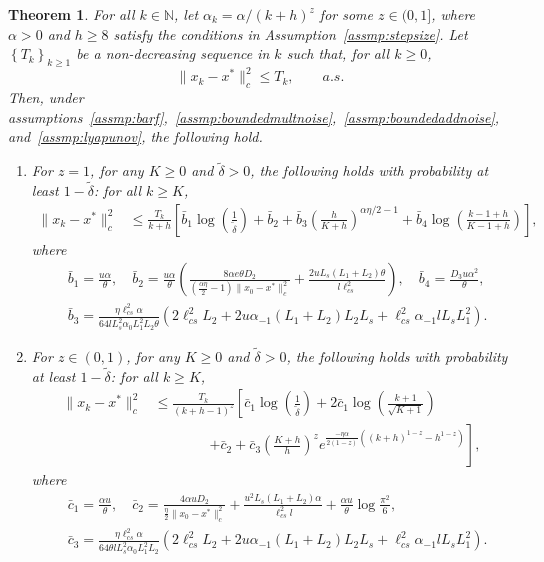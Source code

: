 \documentclass{article}
\newcommand{\lrset}[1]{\left\{ #1 \right\}}
\newcommand{\lrp}[1]{\left( #1 \right)}
\newcommand{\N}{\mathbb{N}}
\newcommand{\lcs}{\ell_{cs}}
\newtheorem{theorem}{Theorem}[section]
\begin{document}
\begin{theorem}\label{th:onestepbootstrap}
    For all $k\in\N$, let $\alpha_k = \alpha/(k+h)^z$ for some $z\in(0,1]$, where $\alpha > 0$ and $h \ge 8$ satisfy the conditions in Assumption~\ref{assmp:stepsize}. Let $\lrset{T_k}_{k\ge 1}$ be a non-decreasing sequence in $k$ such that, for all $k\geq 0$,
    \[ \|x_k - x^*\|^2_c \leq T_k, \qquad a.s. \]
    Then, under assumptions~\ref{assmp:barf},~\ref{assmp:boundedmultnoise},~\ref{assmp:boundedaddnoise}, and~\ref{assmp:lyapunov}, the following hold.
    \begin{enumerate}
    \item \label{part1} For $z=1$, for any $K\ge 0$ and $\tilde{\delta} > 0$, the following holds with probability at least $1- \tilde{\delta}$: for all $k\ge K$, 
\begin{align*}
    \|x_k - x^*\|^2_c & \le \frac{T_k}{k+h} \left[ \bar{b}_1\log\left(\frac{1}{\tilde{\delta}}\right) + \bar{b}_2 + \bar{b}_3\lrp{\frac{h}{K+h}}^{\alpha \eta/2 - 1}    + \bar{b}_4  \log\left(\frac{k-1+h}{K-1+h}\right)  \right], 
\end{align*}
where
\begin{align*}
    &\bar{b}_1 = \frac{u\alpha}{\theta}, \quad \bar{b}_2 = \frac{u\alpha}{\theta}\lrp{ \frac{8\alpha e \theta D_2}{(\frac{\alpha\eta}{2} - 1)\|x_0 - x^*\|^2_c} + \frac{ 2u L_s (L_1 + L_2) \theta }{ l\lcs^2}},\quad \bar{b}_4 = \frac{D_3 u\alpha^2}{\theta},\\
    & \bar{b}_3 = \frac{\eta\lcs^2 \alpha}{64 l L^2_s \alpha_0 L^2_1 L_2 \theta }\lrp{2\lcs^2 L_2 +  2 u \alpha_{-1} (L_1 + L_2)  L_2 L_s + \lcs^2 \alpha_{-1} l L_s L^2_1 }.
\end{align*}
\item \label{partz} For $z\in(0,1)$, for any  $K\ge 0$ and $\tilde{\delta} > 0$, the following holds with probability at least $1 - \tilde{\delta}$: for all $k \ge K$, 
\begin{align*}
    \|x_k - x^*\|^2_c &\le  \frac{T_k}{(k+h-1)^z} \left[ \bar{c}_1\log\lrp{\frac{1}{\tilde{\delta}}} + 2\bar{c}_1\log\lrp{\frac{k+1}{\sqrt{K+1}}} \right. \\
    &\qquad \qquad \left. + \bar{c}_2 + \bar{c}_3 \lrp{\frac{K+h}{h}}^z e^{\frac{-\eta \alpha}{2(1-z)}\lrp{(k+h)^{1-z} - h^{1-z}}} \right],
\end{align*}
where
\begin{align*}
    &\bar{c}_1 = \frac{\alpha u}{\theta}, \quad \bar{c}_2 = \frac{4 \alpha u D_2 }{\frac{\eta}{2}\|x_0 - x^*\|^2_c } + \frac{u^2 L_s (L_1 + L_2) \alpha}{\lcs^2 l} + \frac{\alpha u}{\theta}\log\frac{\pi^2}{6}, \\
    &\bar{c}_3 = \frac{\eta\lcs^2 \alpha }{64 \theta l L^2_s \alpha_0 L^2_1 L_2 }\lrp{2\lcs^2 L_2 +  2 u \alpha_{-1} (L_1 + L_2)  L_2 L_s + \lcs^2 \alpha_{-1} l L_s L^2_1 }.
\end{align*}
\end{enumerate}
\end{theorem}
\end{document}
